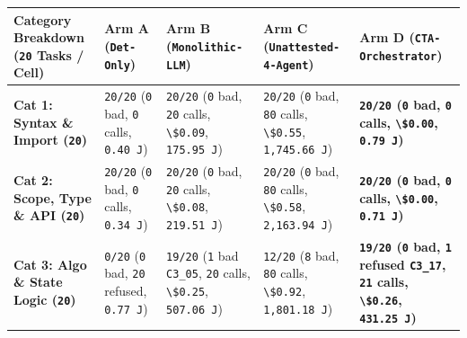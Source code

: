 \documentclass[10pt,letterpaper]{article}
\begin{document}
{\footnotesize\setlength{\tabcolsep}{3.8pt}\renewcommand{\arraystretch}{1.15}
\begin{longtable}[]{@{}
  >{\raggedright\arraybackslash}p{}
  >{\raggedright\arraybackslash}p{}
  >{\raggedright\arraybackslash}p{}
  >{\raggedright\arraybackslash}p{}
  >{\raggedright\arraybackslash}p{}@{}}
\toprule\noalign{}
\begin{minipage}[b]{\linewidth}\raggedright
\textbf{Category Breakdown (\texttt{20} Tasks / Cell)}
\end{minipage} & \begin{minipage}[b]{\linewidth}\raggedright
\textbf{Arm A (\texttt{Det-Only})}
\end{minipage} & \begin{minipage}[b]{\linewidth}\raggedright
\textbf{Arm B (\texttt{Monolithic-\allowbreak{}LLM})}
\end{minipage} & \begin{minipage}[b]{\linewidth}\raggedright
\textbf{Arm C (\texttt{Unattested-\allowbreak{}4-\allowbreak{}Agent})}
\end{minipage} & \begin{minipage}[b]{\linewidth}\raggedright
\textbf{Arm D (\texttt{CTA-\allowbreak{}Orchestrator})}
\end{minipage} \\
\midrule\noalign{}
\endhead
\bottomrule\noalign{}
\endlastfoot
\textbf{Cat 1: Syntax \& Import (\texttt{20})} & \texttt{20/20}
(\texttt{0} bad, \texttt{0} calls, \texttt{0.40\ J}) & \texttt{20/20}
(\texttt{0} bad, \texttt{20} calls, \texttt{\textbackslash{}\$0.09},
\texttt{175.95\ J}) & \texttt{20/20} (\texttt{0} bad, \texttt{80} calls,
\texttt{\textbackslash{}\$0.55}, \texttt{1,\allowbreak{}745.\allowbreak{}66\ J}) &
\textbf{\texttt{20/20} (\texttt{0} bad, \texttt{0} calls,
\texttt{\textbackslash{}\$0.00}, \texttt{0.79\ J})} \\
\textbf{Cat 2: Scope, Type \& API (\texttt{20})} & \texttt{20/20}
(\texttt{0} bad, \texttt{0} calls, \texttt{0.34\ J}) & \texttt{20/20}
(\texttt{0} bad, \texttt{20} calls, \texttt{\textbackslash{}\$0.08},
\texttt{219.51\ J}) & \texttt{20/20} (\texttt{0} bad, \texttt{80} calls,
\texttt{\textbackslash{}\$0.58}, \texttt{2,\allowbreak{}163.\allowbreak{}94\ J}) &
\textbf{\texttt{20/20} (\texttt{0} bad, \texttt{0} calls,
\texttt{\textbackslash{}\$0.00}, \texttt{0.71\ J})} \\
\textbf{Cat 3: Algo \& State Logic (\texttt{20})} & \texttt{0/20}
(\texttt{0} bad, \texttt{20} refused, \texttt{0.77\ J}) & \texttt{19/20}
(\texttt{1} bad \texttt{C3\_05}, \texttt{20} calls,
\texttt{\textbackslash{}\$0.25}, \texttt{507.06\ J}) & \texttt{12/20}
(\texttt{8} bad, \texttt{80} calls, \texttt{\textbackslash{}\$0.92},
\texttt{1,\allowbreak{}801.\allowbreak{}18\ J}) & \textbf{\texttt{19/20} (\texttt{0} bad,
\texttt{1} refused \texttt{C3\_17}, \texttt{21} calls,
\texttt{\textbackslash{}\$0.26}, \texttt{431.25\ J})} \\
\end{longtable}
}
\end{document}
